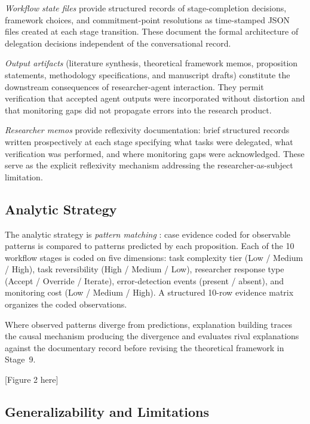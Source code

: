 \documentclass[12pt]{article}
\begin{document}
\textit{Workflow state files} provide structured records of stage-completion decisions,
framework choices, and commitment-point resolutions as time-stamped JSON files created at
each stage transition. These document the formal architecture of delegation decisions
independent of the conversational record.

\textit{Output artifacts} (literature synthesis, theoretical framework memos, proposition
statements, methodology specifications, and manuscript drafts) constitute the downstream
consequences of researcher-agent interaction. They permit verification that accepted agent
outputs were incorporated without distortion and that monitoring gaps did not propagate
errors into the research product.

\textit{Researcher memos} provide reflexivity documentation: brief structured records written
prospectively at each stage specifying what tasks were delegated, what verification was
performed, and where monitoring gaps were acknowledged. These serve as the explicit
reflexivity mechanism addressing the researcher-as-subject limitation.

\subsection{Analytic Strategy}

The analytic strategy is \emph{pattern matching} \citep{yin2014case}: case evidence coded
for observable patterns is compared to patterns predicted by each proposition. Each of the
10 workflow stages is coded on five dimensions: task complexity tier (Low / Medium / High),
task reversibility (High / Medium / Low), researcher response type (Accept / Override /
Iterate), error-detection events (present / absent), and monitoring cost (Low / Medium / High).
A structured 10-row evidence matrix organizes the coded observations.

Where observed patterns diverge from predictions, explanation building \citep{yin2014case}
traces the causal mechanism producing the divergence and evaluates rival explanations against
the documentary record before revising the theoretical framework in Stage~9.

\bigskip

[Figure 2 here]

\bigskip

\subsection{Generalizability and Limitations}
\end{document}
